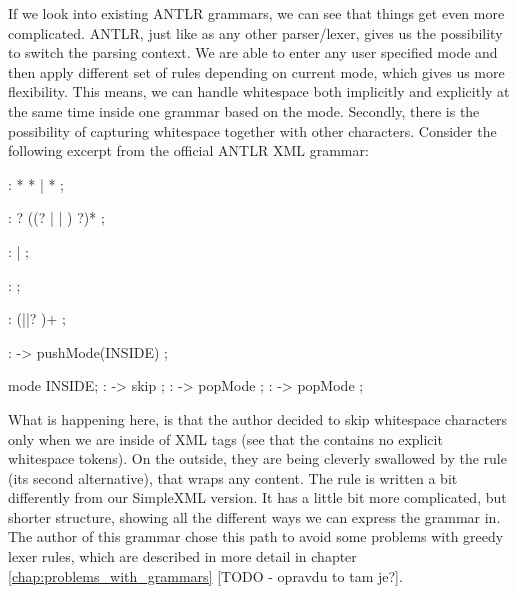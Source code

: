 If we look into existing ANTLR grammars, we can see that things get even more complicated.
ANTLR, just like as any other parser/lexer, gives us the possibility to switch the parsing context.
We are able to enter any user specified mode and then apply different set of rules depending on current mode, which gives us more flexibility.
This means, we can handle whitespace both implicitly and explicitly at the same time inside one grammar based on the mode.
Secondly, there is the possibility of capturing whitespace together with other characters.
Consider the following excerpt from the official ANTLR XML grammar:

\begin{antlr}
	     :   \literal{<}  * \literal{>} * \literal{</}  \literal{>}
	            |   \literal{<}  * \literal{/>}
	            ;

	     :   ?
                ((? |  | ) ?)* ;

	    :    |  ;

	        :   \regex{~[<&]+} ;

	      :   (\literal{ }||? )+ ;

	        :   \literal{<}             -> pushMode(INSIDE) ;

	mode INSIDE;
	           :          -> skip ;
	       :   \literal{<}             -> popMode ;
	 :   \literal{/>}            -> popMode ;
\end{antlr}

What is happening here, is that the author decided to skip whitespace characters only when we are inside of XML tags (see that the  contains no explicit whitespace tokens).
On the outside, they are being cleverly swallowed by the  rule (its second alternative), that wraps any content.
The  rule is written a bit differently from our SimpleXML version.
It has a little bit more complicated, but shorter structure, showing all the different ways we can express the grammar in.
The author of this grammar chose this path to avoid some problems with greedy lexer rules, which are described in more detail in chapter \ref{chap:problems_with_grammars} [TODO - opravdu to tam je?].
\\

